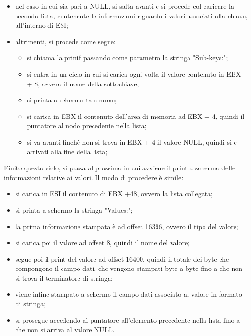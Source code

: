 \documentclass[12pt]{extarticle}
\begin{document}
\begin{itemize}
\item nel caso in cui sia pari a NULL, si salta avanti e si procede col caricare la seconda lista, contenente le informazioni riguardo i valori associati alla chiave, all'interno di ESI;
\item altrimenti, si procede come segue:
\begin{itemize}
\item si chiama la printf passando come parametro la stringa "Sub-keys:";
\item si entra in un ciclo in cui si carica ogni volta il valore contenuto in EBX + 8, ovvero il nome della sottochiave;
\item si printa a schermo tale nome;
\item si carica in EBX il contenuto dell'area di memoria ad EBX + 4, quindi il puntatore al nodo precedente nella lista;
\item si va avanti finché non si trova in EBX + 4 il valore NULL, quindi si è arrivati alla fine della lista;
\end{itemize}
\end{itemize}
Finito questo ciclo, si passa al prossimo in cui avviene il print a schermo delle informazioni relative ai valori. Il modo di procedere è simile:
\begin{itemize}
\item si carica in ESI il contenuto di EBX +48, ovvero la lista collegata;
\item si printa a schermo la stringa "Values:";
\item la prima informazione stampata è ad offset 16396, ovvero il tipo del valore;
\item si carica poi il valore ad offset 8, quindi il nome del valore;
\item segue poi il print del valore ad offset 16400, quindi il totale dei byte che compongono il campo dati, che vengono stampati byte a byte fino a che non si trova il terminatore di stringa;
\item viene infine stampato a schermo il campo dati associato al valore in formato di stringa;
\item si prosegue accedendo al puntatore all'elemento precedente nella lista fino a che non si arriva al valore NULL.
\end{itemize}
\end{document}
